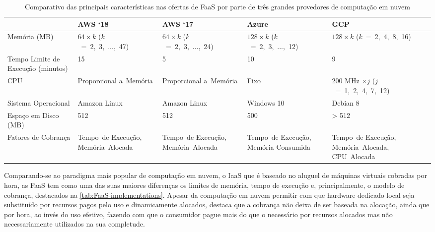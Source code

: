\documentclass[english,brazilian]{UNISINOSmonografia} %
\newcommand\defaultFigureWidth{0.9}
\renewcommand{\arraystretch}{1.3}
\begin{document}
\begin{table}[tb]
\centering%
\begin{minipage}{\defaultFigureWidth\textwidth}
	\caption{Comparativo das principais características nas ofertas de FaaS por parte de três grandes provedores de computação em nuvem}
	\label{tab:FaaS-implementations}
	\small
	\vspace{1ex}
	\renewcommand\arraystretch{1.4}
	\renewcommand {\tabularxcolumn}[1]{>{\arraybackslash}m{#1}}
	\begin{tabularx}{\textwidth}{@{}WYYYY@{}}
		\toprule
		& {AWS \textquoteleft18} & {AWS \textquoteleft17} & {Azure} & {GCP} \\ 
		\midrule
		{Memória (MB)} & $ 64 \times k $ ($k$~=~2,~3,~...,~47) & $ 64 \times k $ ($k$~=~2,~3,~...,~24) & $ 128 \times k $ ($k$~=~2,~3,~...,~12) & $ 128 \times k $ ($k$~=~2,~4,~8,~16) \\
		{Tempo Limite de Execução (minutos)} & 15 & 5 & 10 & 9 \\
		{CPU} & Proporcional a~Memória & Proporcional a~Memória & Fixo & $ 200 $ MHz $ \times j $ ($j$~=~1,~2,~4,~7,~12) \\
		{Sistema Operacional} & Amazon Linux & Amazon Linux & Windows 10 & Debian 8 \\
		{Espaço em Disco (MB)} & 512 & 512 & 500 & > 512 \\
		{Fatores de Cobrança} & {\footnotesize Tempo~de Execução, Memória~Alocada} & {\footnotesize Tempo~de Execução, Memória~Alocada} & {\footnotesize Tempo~de Execução, Memória Consumida} & {\footnotesize Tempo~de Execução, Memória~Alocada, CPU~Alocada} \\ 
		\bottomrule	\end{tabularx}
\end{minipage}
\end{table}


Comparando-se ao paradigma mais popular de computação em nuvem, o IaaS que é baseado no aluguel de máquinas virtuais cobradas por hora, as FaaS tem como uma das suas maiores diferenças os limites de memória, tempo de execução e, principalmente, o modelo de cobrança, destacados na \autoref{tab:FaaS-implementations}. 
Apesar da computação em nuvem permitir com que hardware dedicado local seja substituído por recursos pagos pelo uso e dinamicamente alocados,  destaca que a cobrança não deixa de ser baseada na alocação, ainda que por hora, ao invés do uso efetivo, fazendo com que o consumidor pague mais do que o necessário por recursos alocados mas não necessariamente utilizados na sua completude.
\end{document}
